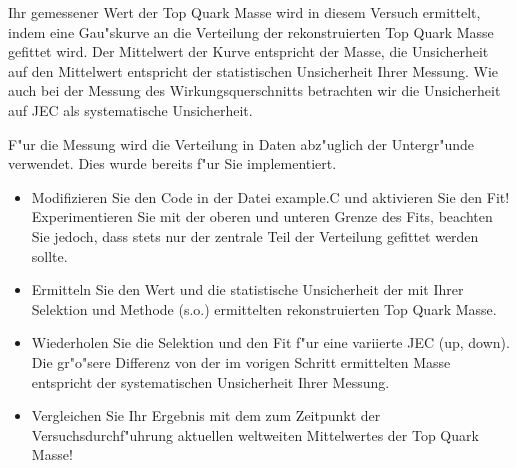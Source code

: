 Ihr gemessener Wert der Top Quark Masse wird in diesem Versuch ermittelt, indem eine Gau"skurve an die Verteilung der rekonstruierten Top Quark Masse gefittet wird. Der Mittelwert der Kurve entspricht der Masse, die Unsicherheit auf den Mittelwert entspricht der statistischen Unsicherheit Ihrer Messung. Wie auch bei der Messung des Wirkungsquerschnitts betrachten wir die Unsicherheit auf JEC als systematische Unsicherheit. 

F"ur die Messung wird die Verteilung in Daten abz"uglich der Untergr"unde verwendet. Dies wurde bereits f"ur Sie implementiert.

\begin{itemize}
\item Modifizieren Sie den Code in der Datei example.C und aktivieren Sie den Fit! Experimentieren Sie mit der oberen und unteren Grenze des Fits, beachten Sie jedoch, dass stets nur der zentrale Teil der Verteilung gefittet werden sollte.

\item Ermitteln Sie den Wert und die statistische Unsicherheit der mit Ihrer Selektion und Methode (s.o.) ermittelten rekonstruierten Top Quark Masse.

\item Wiederholen Sie die Selektion und den Fit f"ur eine variierte JEC (up, down). Die gr"o"sere Differenz von der im vorigen Schritt ermittelten Masse entspricht der systematischen Unsicherheit Ihrer Messung. 

\item Vergleichen Sie Ihr Ergebnis mit dem zum Zeitpunkt der Versuchsdurchf"uhrung aktuellen weltweiten Mittelwertes der Top Quark Masse!
\end{itemize}